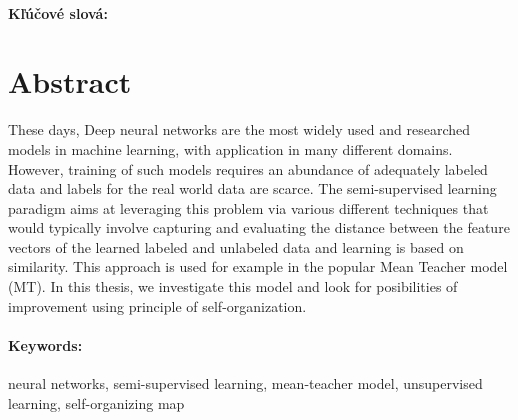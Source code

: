 \documentclass[12pt, twoside]{book}
\begin{document}
\color{black}



\paragraph*{Kľúčové slová:} 




\newpage 
\section*{Abstract}

\color{red}

These days, Deep neural networks are the most widely used and researched models in machine learning, with application in many different domains. However, training of such models requires an abundance of adequately labeled data and labels for the real world data are scarce. The semi-supervised learning paradigm aims at leveraging this problem via various different techniques that would typically involve capturing and evaluating the distance between the feature vectors of the learned labeled and unlabeled data and learning is based on similarity. This approach is used for example in the popular Mean Teacher model (MT). In this thesis, we investigate this model and look for posibilities of improvement using principle of self-organization.

\color{black}




\paragraph*{Keywords:} neural networks, semi-supervised learning, mean-teacher model, unsupervised learning, self-organizing map %



%
%
%
%
\end{document}
